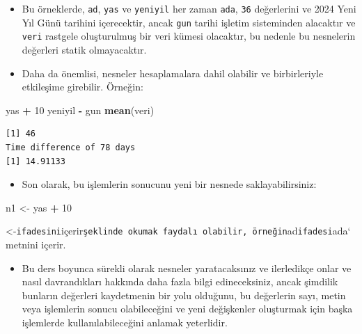 \documentclass[
  oneside]{book}
\newenvironment{Shaded}{\begin{snugshade}}{\end{snugshade}}
\newcommand{\DecValTok}[1]{\textcolor[rgb]{0.00,0.00,0.81}{#1}}
\newcommand{\FunctionTok}[1]{\textcolor[rgb]{0.13,0.29,0.53}{\textbf{#1}}}
\newcommand{\NormalTok}[1]{#1}
\newcommand{\OtherTok}[1]{\textcolor[rgb]{0.56,0.35,0.01}{#1}}
\newcommand{\SpecialCharTok}[1]{\textcolor[rgb]{0.81,0.36,0.00}{\textbf{#1}}}
\providecommand{\tightlist}{%
  \setlength{\itemsep}{0pt}\setlength{\parskip}{0pt}}
\begin{document}
\begin{itemize}
\item
  Bu örneklerde, \texttt{ad}, \texttt{yas} ve \texttt{yeniyil} her zaman \texttt{ada}, \texttt{36} değerlerini ve 2024 Yeni Yıl Günü tarihini içerecektir, ancak \texttt{gun} tarihi işletim sisteminden alacaktır ve \texttt{veri} rastgele oluşturulmuş bir veri kümesi olacaktır, bu nedenle bu nesnelerin değerleri statik olmayacaktır.
\item
  Daha da önemlisi, nesneler hesaplamalara dahil olabilir ve birbirleriyle etkileşime girebilir. Örneğin:
\end{itemize}

\begin{Shaded}
\begin{Highlighting}[]
\NormalTok{yas }\SpecialCharTok{+} \DecValTok{10}
\NormalTok{yeniyil }\SpecialCharTok{{-}}\NormalTok{ gun}
\FunctionTok{mean}\NormalTok{(veri)}
\end{Highlighting}
\end{Shaded}

\begin{verbatim}
[1] 46
Time difference of 78 days
[1] 14.91133
\end{verbatim}

\begin{itemize}
\tightlist
\item
  Son olarak, bu işlemlerin sonucunu yeni bir nesnede saklayabilirsiniz:
\end{itemize}

\begin{Shaded}
\begin{Highlighting}[]
\NormalTok{n1 }\OtherTok{\textless{}{-}}\NormalTok{ yas }\SpecialCharTok{+} \DecValTok{10}
\end{Highlighting}
\end{Shaded}

\begin{try}
\textless-\texttt{ifadesini}içerir\texttt{şeklinde\ okumak\ faydalı\ olabilir,\ örneğin}ad\texttt{ifadesi}ada`
metnini içerir.
\end{try}

\begin{itemize}
\tightlist
\item
  Bu ders boyunca sürekli olarak nesneler yaratacaksınız ve ilerledikçe onlar ve nasıl davrandıkları hakkında daha fazla bilgi edineceksiniz, ancak şimdilik bunların değerleri kaydetmenin bir yolu olduğunu, bu değerlerin sayı, metin veya işlemlerin sonucu olabileceğini ve yeni değişkenler oluşturmak için başka işlemlerde kullanılabileceğini anlamak yeterlidir.
\end{itemize}
\end{document}
